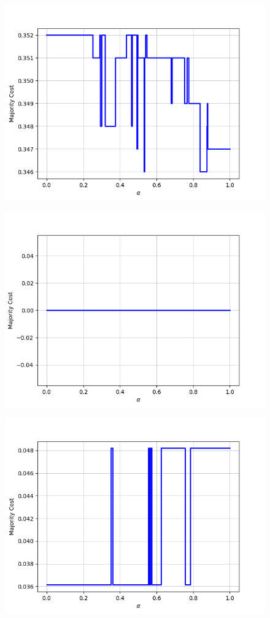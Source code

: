 \begin{figure}[h]
\begin{minipage}{.24\textwidth}
  {\includegraphics[width=\linewidth]{plots/nell-ac/publication}}
\end{minipage}
\begin{minipage}{.24\textwidth}
  \centering
  {\includegraphics[width=\linewidth]{plots/nell-ac/school}}
\end{minipage}
\begin{minipage}{.24\textwidth}
  \centering
  {\includegraphics[width=\linewidth]{plots/nell-ac/software}}

\end{minipage}
\end{figure}

